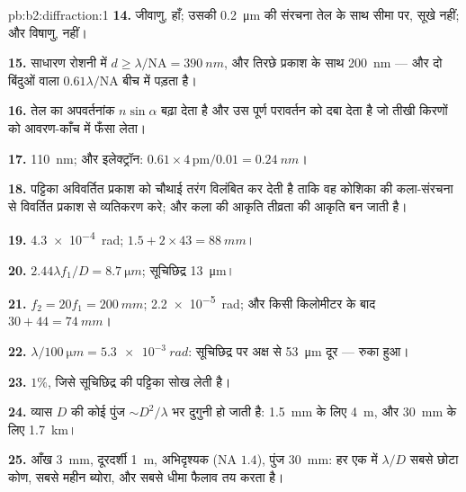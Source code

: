 \begin{solution}{pb:b2:diffraction:1}
\textbf{14.} जीवाणु, हाँ; उसकी \qty{0.2}{\micro m} की संरचना तेल के साथ सीमा पर,
सूखे नहीं; और विषाणु, नहीं।

\textbf{15.} साधारण रोशनी में $d \ge \lambda/\mathrm{NA} = \qty{390}{nm}$, और तिरछे प्रकाश
के साथ \qty{200}{nm} --- और दो बिंदुओं वाला $0.61\lambda/\mathrm{NA}$ बीच में पड़ता है।

\textbf{16.} तेल का अपवर्तनांक $n\sin\alpha$ बढ़ा देता है और उस पूर्ण
परावर्तन को दबा देता है जो तीखी किरणों को आवरण-काँच में फँसा लेता।

\textbf{17.} \qty{110}{nm}; और इलेक्ट्रॉन: $0.61 \times 4\,\text{pm}/0.01 = \qty{0.24}{nm}$।

\textbf{18.} पट्टिका अविवर्तित प्रकाश को चौथाई तरंग विलंबित कर देती है
ताकि वह कोशिका की कला-संरचना से विवर्तित प्रकाश से व्यतिकरण करे; और
कला की आकृति तीव्रता की आकृति बन जाती है।

\textbf{19.} \qty{4.3e-4}{rad}; $1.5 + 2 \times 43 = \qty{88}{mm}$।

\textbf{20.} $2.44\lambda f_1/D = \qty{8.7}{\micro m}$; सूचिछिद्र \qty{13}{\micro m}।

\textbf{21.} $f_2 = 20f_1 = \qty{200}{mm}$; \qty{2.2e-5}{rad}; और किसी किलोमीटर के बाद
$30 + 44 = \qty{74}{mm}$।

\textbf{22.} $\lambda/\qty{100}{\micro m} = \qty{5.3e-3}{rad}$: सूचिछिद्र पर अक्ष से \qty{53}{\micro m}
दूर --- रुका हुआ।

\textbf{23.} $1\%$, जिसे सूचिछिद्र की पट्टिका सोख लेती है।

\textbf{24.} व्यास $D$ की कोई पुंज $\sim D^2/\lambda$ भर दुगुनी हो जाती है: \qty{1.5}{mm} के लिए
\qty{4}{m}, और \qty{30}{mm} के लिए \qty{1.7}{km}।

\textbf{25.} आँख \qty{3}{mm}, दूरदर्शी \qty{1}{m}, अभिदृश्यक (NA $1.4$), पुंज
\qty{30}{mm}: हर एक में $\lambda/D$ सबसे छोटा कोण, सबसे महीन ब्योरा, और
सबसे धीमा फैलाव तय करता है।
\end{solution}
